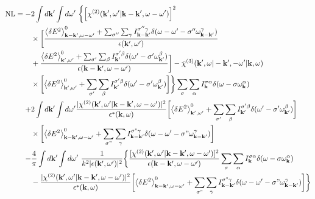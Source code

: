 \documentclass[12pt,a4paper,ruledheader]{report}
\begin{document}
\begin{align}
  \mbox{NL}
 =-&2\int d{\bf k'} \int d\omega '\
     \biggl\{ \left[\chi^{(2)}({\bf k'},\omega '|{\bf k-k'},
     \omega-\omega ')\right]^2
     \nonumber\\
  &\times\biggl[\frac{\left< \delta E^2 \right>_{{\bf k-k'},\omega-\omega '}^0
     +\sum_{\sigma ''}\sum_{\gamma} I_{\bf k -k'}^{\sigma '' \gamma}
     \delta(\omega-\omega ' -\sigma '' \omega_{\bf k -k'}^\gamma)}
     {\epsilon({\bf k'},\omega ')}
  \label{nlebe-gen}\\
  &+\frac{\left< \delta E^2 \right>_{{\bf k'},\omega '}^0
  +\sum_{\sigma '}\sum_{\beta}
  I_{\bf k'}^{\sigma ' \beta}\delta(\omega '-\sigma ' \omega_{\bf k'}^\beta)}
     {\epsilon({\bf k-k'},\omega-\omega ')}\biggr]
     -\bar \chi^{(3)}({\bf k'},\omega|-{\bf k'},-\omega '|{\bf k},\omega)
     \nonumber\\
     &\times\biggl[ \left< \delta E^2 \right>_{{\bf k'},\omega '}^0
	+\sum_{\sigma '}\sum_{\beta}I_{\bf k'}^{\sigma ' \beta}
	\delta(\omega '-\sigma ' \omega_{\bf k'}^\beta) \biggr]\biggr\}
	\sum_{\sigma}\sum_{\alpha}
  I_{\bf k}^{\sigma \alpha}\delta(\omega-\sigma \omega_{\bf k}^\alpha)
	\nonumber\\
  +&2\int d{\bf k'} \int d\omega '
  \frac{|\chi^{(2)}({\bf k'},\omega '|{\bf k-k'},\omega-\omega ')|^2}
     {\epsilon^*({\bf k},\omega)}\biggl[ \left< \delta E^2 \right>_{{\bf k'},\omega '}^0
  +\sum_{\sigma '}\sum_{\beta}
     I_{\bf k'}^{\sigma ' \beta}\delta(\omega '-\sigma ' \omega_{\bf k'}^\beta) \biggr]
  \nonumber\\
  &\times \biggl[  \left< \delta E^2 \right>_{{\bf k-k'},\omega-\omega '}^0
     +\sum_{\sigma"}\sum_{\gamma} I_{\bf k -k'}^{\sigma" \gamma}
     \delta(\omega-\omega ' -\sigma" \omega_{\bf k -k'}^\gamma) \biggr]
     \nonumber\\
-&\frac{4}{\pi}\int d{\bf k '} \int d\omega '\
\frac{1}{k^2|\epsilon({\bf k'},\omega ')|^2}
\biggl\{ \frac{[\chi^{(2)}({\bf k'},\omega '|{\bf k-k'},\omega-\omega ')]^2}
{\epsilon({\bf k-k'},\omega-\omega ')}\sum_{\sigma}\sum_{\alpha}
   I_{\bf k}^{\sigma \alpha}\delta(\omega-\sigma \omega_{\bf k}^\alpha)
   \nonumber\\
  &-\frac{|\chi^{(2)}({\bf k'},\omega '|{\bf k-k'},\omega-\omega ')|^2}
   {\epsilon^*({\bf k},\omega)}
     \biggl[ \left< \delta E^2 \right>_{{\bf k-k'},\omega-\omega '}^0
     +\sum_{\sigma"}\sum_{\gamma}I_{\bf k -k'}^{\sigma" \gamma}
     \delta(\omega-\omega ' -\sigma" \omega_{\bf k -k'}^\gamma)\biggr]\biggr\}
    \nonumber
\end{align}
\end{document}
